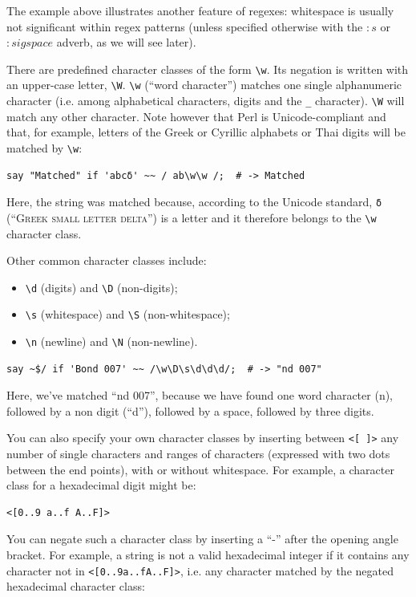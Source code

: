 The example above illustrates another feature of regexes: 
whitespace is usually not significant within regex patterns 
(unless specified otherwise with the $:s$ or $:sigspace$ 
adverb, as we will see later).

There are predefined character classes of the form \verb'\w'. 
Its negation is written with an upper-case letter, \verb'\W'. 
\verb'\w' (``word character'') 
matches one single alphanumeric character (i.e. among alphabetical 
characters, digits and the \verb'_' character). \verb'\W' will match 
any other character. Note however that Perl is Unicode-compliant 
and that, for example, letters of the Greek or Cyrillic alphabets or 
Thai digits will be matched by \verb'\w':

\begin{verbatim}
say "Matched" if 'abcδ' ~~ / ab\w\w /;  # -> Matched
\end{verbatim}
%

Here, the string was matched because, according to the 
Unicode standard, \verb'δ' (``\textsc{Greek small letter 
delta}'') is a letter and it therefore belongs to 
the \verb'\w' character class.

Other common character classes include:
\begin{itemize}
\item \verb'\d' (digits) and \verb'\D' (non-digits);
\item \verb'\s' (whitespace) and \verb'\S' (non-whitespace);
\item \verb'\n' (newline) and \verb'\N' (non-newline).
\end{itemize}

\begin{verbatim}
say ~$/ if 'Bond 007' ~~ /\w\D\s\d\d\d/;  # -> "nd 007"
\end{verbatim}
%

Here, we've matched ``nd 007'', because we have found one 
word character (n), followed by a non digit (``d''), followed 
by a space, followed by three digits.

You can also specify your own character classes by inserting 
between \verb'<[ ]>' any number of single characters and 
ranges of characters (expressed with two dots between the 
end points), with or without whitespace. For example, a 
character class for a hexadecimal digit might be:
\begin{verbatim}
<[0..9 a..f A..F]>
\end{verbatim}

You can negate such a character class by inserting a ``-'' after 
the opening angle bracket. For example, a string is not a 
valid hexadecimal integer if it contains any character not 
in \verb'<[0..9a..fA..F]>', i.e. any character matched by the 
negated hexadecimal character class:

